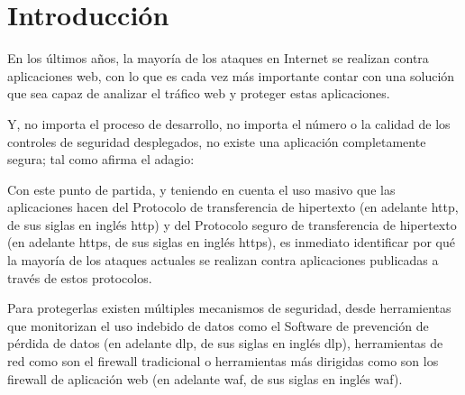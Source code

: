\chapter{Introducción}
\par En los últimos años, la mayoría de los ataques en Internet se realizan contra aplicaciones web, con lo que es cada vez más importante contar con una
solución que sea capaz de analizar el tráfico web y proteger estas aplicaciones.
\par Y, no importa el proceso de desarrollo, no importa el número o la calidad de los controles de seguridad desplegados, no existe una aplicación completamente
segura; tal como afirma el adagio:


\par Con este punto de partida, y teniendo en cuenta el uso masivo que las aplicaciones hacen del Protocolo de transferencia de hipertexto (en adelante
\acrshort{http}, de sus siglas en inglés \acrlong{http}) y del Protocolo seguro de transferencia de hipertexto (en adelante \acrshort{https}, de sus siglas en
inglés \acrlong{https}), es inmediato identificar por qué la mayoría de los ataques actuales se realizan contra aplicaciones publicadas a través de estos
protocolos.

\par Para protegerlas existen múltiples mecanismos de seguridad, desde herramientas que monitorizan el uso indebido de datos como el Software de prevención de
pérdida de datos (en adelante \acrshort{dlp}, de sus siglas en inglés \acrlong{dlp}), herramientas de red como son el firewall tradicional o herramientas más
dirigidas como son los firewall de aplicación web (en adelante \acrshort{waf}, de sus siglas en inglés \acrlong{waf}).

